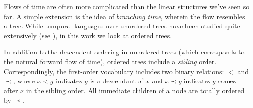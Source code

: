 \documentclass[a4paper,UKenglish,cleveref, autoref, thm-restate]{lipics-v2021}
\begin{document}

Flows of time are often more complicated than the linear structures we've seen so far. A simple extension is the idea of \textit{branching time}, wherein the flow resembles a tree. While temporal languages over unordered trees have been studied quite extensively (see \cite{RabinovichUnordered00}), in this work we look at ordered trees.

In addition to the descendent ordering in unordered trees (which corresponds to the natural forward flow of time), ordered trees include a \textit{sibling} order. Correspondingly, the first-order vocabulary includes two binary relations: $<$ and $\prec$, where $x < y$ indicates $y$ is a descendant of $x$ and $x \prec y$ indicates $y$ comes after $x$ in the sibling order. All immediate children of a node are totally ordered by $\prec$. %
\end{document}
